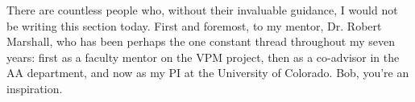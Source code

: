 %
%
%
%
%
%

There are countless people who, without their invaluable guidance, I would not be writing this section today. First and foremost, to my mentor, Dr. Robert Marshall, who has been perhaps the one constant thread throughout my seven years: first as a faculty mentor on the VPM project, then as a co-advisor in the AA department, and now as my PI at the University of Colorado. Bob, you're an inspiration.

